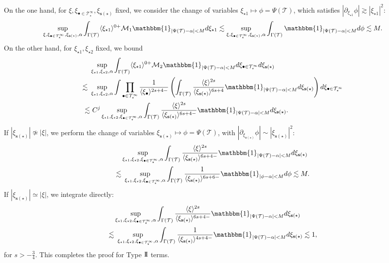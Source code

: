 \documentclass[%
11pt,  reqno]{amsart}
\newcommand{\jap}[1]{\langle #1 \rangle}
\newcommand{\II}{\textup{I \hspace{-2.9mm} I} }
\newcommand{\5}{\textup{V}}
\newcommand{\les}{\lesssim}
\theoremstyle{remark}
\newcommand{\bul}{\bullet}
\newcommand{\TT}{\mathcal{T}}
\newcommand{\G}{\Gamma}
\newcommand{\sbf}{\mathbf{s}}
\newcommand{\M}{\mathcal{M}}
\numberwithin{equation}{section}
\numberwithin{theorem}{section}
\begin{document}
On the one hand, for $\xi, \xi_{\bul\in \TT^\infty_\star}, \xi_{\sbf(\star)}$ fixed, we consider the change of variables $\xi_{\star1}\mapsto \phi=\Psi(\TT)$, which satisfies $|\partial_{\xi_{\star1}} \phi|\gtrsim |\xi_{\star1}|^2$:
\begin{align*}
    \sup_{\xi, \xi_{\bul\in \TT^\infty_\star}, \xi_{\sbf(\star)}, \alpha} \int_{\Gamma(\TT)} \jap{\xi_{\star1}}^{0+}\M_1 \mathbbm{1}_{|\Psi(\TT)-\alpha|<M}d\xi_{\star1}\lesssim \sup_{\xi, \xi_{\bul\in \TT^\infty_\star}, \xi_{\sbf(\star)}, \alpha} \int_{\Gamma(\TT)} \mathbbm{1}_{|\Psi(\TT)-\alpha|<M}d\phi\lesssim M.
\end{align*}
On the other hand, for $\xi_{\star1}, \xi_{\star2}$ fixed, we bound
\begin{align*}
    &\sup_{\xi_{\star1}, \xi_{\star2}, \alpha} \int_{\G(\TT)} \jap{\xi_{\star1}}^{0+}\M_2 \mathbbm{1}_{|\Psi(\TT)-\alpha|<M}d\xi_{\bul\in\TT^\infty_\star}d\xi_{\sbf(\star)} \\\lesssim \ &\sup_{\xi_{\star1}, \xi_{\star2}, \alpha} \int \prod_{\bul\in\TT^\infty_\star} \frac{1}{\jap{\xi_\bul}^{2s+4 - }}\left(\int_{\G(\TT)} \frac{\jap{\xi}^{2s}}{\jap{\xi_{\sbf(\star)}}^{6s+4}} \mathbbm{1}_{|\Psi(\TT)-\alpha|<M}d\xi_{\sbf(\star)} \right) d\xi_{\bul\in\TT^\infty_\star}\\\lesssim &\  C^j \sup_{\xi_{\star1}, \xi_{\star2}, \xi_{\bul\in\TT^\infty_\star}, \alpha}\int_{\G(\TT)} \frac{\jap{\xi}^{2s}}{\jap{\xi_{\sbf(\star)}}^{6s+4 - }} \mathbbm{1}_{|\Psi(\TT)-\alpha|<M}d\xi_{\sbf(\star)} 
    .
\end{align*}
If $|\xi_{\sbf(\star)}|\not\simeq|\xi|$, we perform the change of variables $\xi_{\sbf(\star)}\mapsto \phi= \Psi(\TT)$, with $|\partial_{\xi_{\sbf(\star)}}\phi|\sim |\xi_{\sbf(\star)}|^2$:
\begin{align*}
    &\sup_{\xi_{\star1}, \xi_{\star2}, \xi_{\bul\in\TT^\infty_\star}, \alpha}\int_{\G(\TT)} \frac{\jap{\xi}^{2s}}{\jap{\xi_{\sbf(\star)}}^{6s+4 - }} \mathbbm{1}_{|\Psi(\TT)-\alpha|<M}d\xi_{\sbf(\star)} \\\lesssim & \ \sup_{\xi_{\star1}, \xi_{\star2}, \xi_{\bul\in\TT^\infty_\star}, \alpha}\int_{\G(\TT)} \frac{1}{\jap{\xi_{\sbf(\star)}}^{6s+6-}} \mathbbm{1}_{|\phi-\alpha|<M}d\phi \lesssim M.
\end{align*}
If $|\xi_{\sbf(\star)}|\simeq |\xi|$, we integrate directly:
\begin{align}
 &
 \sup_{\xi_{\star1}, \xi_{\star2}, \xi_{\bul\in\TT^\infty_\star}, \alpha}\int_{\G(\TT)} \frac{\jap{\xi}^{2s}}{\jap{\xi_{\sbf(\star)}}^{6s+4 - }} \mathbbm{1}_{|\Psi(\TT)-\alpha|<M}d\xi_{\sbf(\star)}
 \\
  \les 
  &
  \
  \sup_{\xi_{\star1}, \xi_{\star2}, \xi_{\bul\in\TT^\infty_\star}, \alpha}\int_{\G(\TT)} \frac{1}{\jap{\xi_{\sbf(\star)}}^{4s+4 - }} \mathbbm{1}_{|\Psi(\TT)-\alpha|<M}d\xi_{\sbf(\star)} \les 1, 
\end{align}
for $s>- \frac34$. This completes the proof for Type $\II$ terms. 
\end{document}

